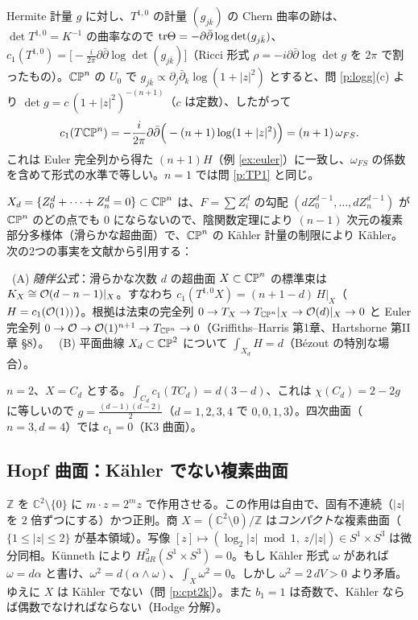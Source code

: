 \begin{ex}\label{ex:ricci}\tP
Hermite 計量 $g$ に対し、$T^{1,0}$ の計量 $(g_{j\bar k})$ の Chern 曲率の跡は、$\det T^{1,0}=K^{-1}$ の曲率なので $\mathrm{tr}\Theta=-\partial\bar\partial\log\det(g_{j\bar k})$、$c_1(T^{1,0})=\big[-\frac i{2\pi}\partial\bar\partial\log\det(g_{j\bar k})\big]$（Ricci 形式 $\rho=-i\partial\bar\partial\log\det g$ を $2\pi$ で割ったもの）。$\mathbb{CP}^n$ の $U_0$ で $g_{j\bar k}\propto\partial_j\bar\partial_k\log(1+|z|^2)$ とすると、問 \ref{p:logg}(c) より $\det g=c\,(1+|z|^2)^{-(n+1)}$（$c$ は定数）、したがって
\[
c_1(T\mathbb{CP}^n)=-\frac i{2\pi}\partial\bar\partial\Big(-(n+1)\log(1+|z|^2)\Big)=(n+1)\,\omega_{FS} .
\]
これは Euler 完全列から得た $(n+1)H$（例 \ref{ex:euler}）に一致し、$\omega_{FS}$ の係数を含めて形式の水準で等しい。$n=1$ では問 \ref{p:TP1} と同じ。
\end{ex}

\begin{ex}\label{ex:fermat}
$X_d=\{Z_0^d+\cdots+Z_n^d=0\}\subset\mathbb{CP}^n$ は、$F=\sum Z_i^d$ の勾配 $(dZ_0^{d-1},\dots,dZ_n^{d-1})$ が $\mathbb{CP}^n$ のどの点でも $0$ にならないので、陰関数定理により $(n-1)$ 次元の複素部分多様体（滑らかな超曲面）で、$\mathbb{CP}^n$ の Kähler 計量の制限により Kähler。次の2つの事実を文献から引用する：

\tC\ (A) \emph{随伴公式}：滑らかな次数 $d$ の超曲面 $X\subset\mathbb{CP}^n$ の標準束は $K_X\cong\mathcal O(d-n-1)|_X$。すなわち $c_1(T^{1,0}X)=(n+1-d)\,H|_X$（$H=c_1(\mathcal O(1))$）。根拠は法束の完全列 $0\to T_X\to T_{\mathbb{CP}^n}|_X\to\mathcal O(d)|_X\to0$ と Euler 完全列 $0\to\mathcal O\to\mathcal O(1)^{n+1}\to T_{\mathbb{CP}^n}\to0$（Griffiths--Harris 第1章、Hartshorne 第II章 §8）。
\tC\ (B) 平面曲線 $X_d\subset\mathbb{CP}^2$ について $\int_{X_d}H=d$（Bézout の特別な場合）。

$n=2$、$X=C_d$ とする。$\int_{C_d}c_1(TC_d)=d(3-d)$、これは $\chi(C_d)=2-2g$ に等しいので $g=\frac{(d-1)(d-2)}2$（$d=1,2,3,4$ で $0,0,1,3$）。四次曲面（$n=3,d=4$）では $c_1=0$（K3 曲面）。
\end{ex}

\subsection{Hopf 曲面：Kähler でない複素曲面}
\begin{ex}[Hopf 曲面]\label{ex:hopf}\tP
$\mathbb Z$ を $\mathbb C^2\setminus\{0\}$ に $m\cdot z=2^mz$ で作用させる。この作用は自由で、固有不連続（$|z|$ を $2$ 倍ずつにする）かつ正則。商 $X=(\mathbb C^2\setminus 0)/\mathbb Z$ は\emph{コンパクト}な複素曲面（$\{1\le|z|\le2\}$ が基本領域）。写像 $[z]\mapsto(\log_2|z|\bmod1,\ z/|z|)\in S^1\times S^3$ は微分同相。Künneth により $H^2_{dR}(S^1\times S^3)=0$。もし Kähler 形式 $\omega$ があれば $\omega=d\alpha$ と書け、$\omega^2=d(\alpha\wedge\omega)$、$\int_X\omega^2=0$。しかし $\omega^2=2\,dV>0$ より矛盾。ゆえに $X$ は Kähler でない（問 \ref{p:cpt2k}）。また $b_1=1$ は奇数で、Kähler ならば偶数でなければならない（Hodge 分解）。
\end{ex}

